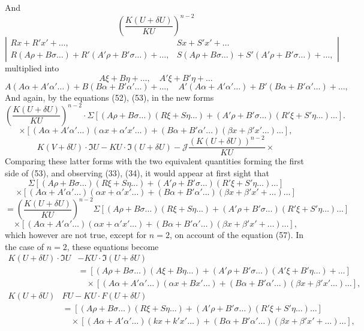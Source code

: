 \documentclass[11pt,a4paper]{book}
\begin{document}
And
\[
\left(\frac{K(U+\delta U)}{KU}\right)^{n-2}
\]
\[
\left|\begin{array}{cc}
Rx + R'x' + \ldots, & Sx + S'x' + \ldots \\
R(A\rho + B\sigma \ldots) + R'(A'\rho + B'\sigma \ldots) + \ldots, &
S(A\rho + B\sigma \ldots) + S'(A'\rho + B'\sigma \ldots) + \ldots,
\end{array}\right|
\]
multiplied into
\[
A\xi + B\eta + \ldots, \quad A'\xi + B'\eta + \ldots
\]
\[
A(A\alpha + A'\alpha' \ldots) + B(B\alpha + B'\alpha' \ldots) + \ldots, \quad
A'(A\alpha + A'\alpha' \ldots) + B'(B\alpha + B'\alpha' \ldots) + \ldots,
\]
And again, by the equations (52), (53), in the new forms
\[
\left(\frac{K(U+\delta U)}{KU}\right)^{n-2} \cdot
\Sigma[(A\rho + B\sigma \ldots)(R\xi + S\eta \ldots) + (A'\rho + B'\sigma \ldots)(R'\xi + S'\eta \ldots) \ldots]
\tag{65}.
\]
\[
\times [(A\alpha + A'\alpha' \ldots)(\alpha x + \alpha'x' \ldots) + (B\alpha + B'\alpha' \ldots)(\beta x + \beta'x' \ldots) \ldots]
\tag{66},
\]
\newpage
\[
K(V+\delta U) \cdot \mathfrak{I}U - KU \cdot \mathfrak{I}(U+\delta U)
-
\mathcal{J}\frac{(K(U+\delta U))^{n-2}}{KU} \times
\]
Comparing these latter forms with the two equivalent quantities forming the first side
of (53), and observing (33), (34), it would appear at first sight that
\[
\Sigma[(A\rho + B\sigma \ldots)(R\xi + S\eta \ldots) + (A'\rho + B'\sigma \ldots)(R'\xi + S'\eta \ldots) \ldots]
\]
\[
\times [(A\alpha + A'\alpha' \ldots)(\alpha x + \alpha'x' \ldots) + (B\alpha + B'\alpha' \ldots)(\beta x + \beta'x' + \ldots) \ldots]
\]
\[
= \left(\frac{K(U+\delta U)}{KU}\right)^{n-2} \Sigma[(A\rho + B\sigma \ldots)(R\xi + S\eta \ldots) + (A'\rho + B'\sigma \ldots)(R'\xi + S'\eta \ldots) \ldots]
\]
\[
\times [(A\alpha + A'\alpha' \ldots)(\alpha x + \alpha'x' \ldots) + (B\alpha + B'\alpha' \ldots)(\beta x + \beta'x' + \ldots) \ldots],
\]
which however are not true, except for $n = 2$, on account of the equation (57). In
the case of $n=2$, these equations become
\begin{align*}
K(U+\delta U) \cdot \mathfrak{I}U &- KU \cdot \mathfrak{I}(U+\delta U) \\
&= [(A\rho + B\sigma \ldots)(A\xi + B\eta \ldots) + (A'\rho + B'\sigma \ldots)(A'\xi + B'\eta \ldots) + \ldots] \\
&\quad \times [(A\alpha + A'\alpha' \ldots)(\alpha x + Bx' \ldots) + (B\alpha + B'\alpha' \ldots)(\beta x + \beta'x' \ldots) \ldots] \tag{68},
\end{align*}
\begin{align*}
K(U+\delta U) & FU - KU \cdot F(U+\delta U) \\
&= [(A\rho + B\sigma \ldots)(R\xi + S\eta \ldots) + (A'\rho + B'\sigma \ldots)(R'\xi + S'\eta \ldots) \ldots] \\
&\quad \times [(A\alpha + A'\alpha' \ldots)(kx + k'x' \ldots) + (B\alpha + B'\alpha' \ldots)(\beta x + \beta'x' + \ldots) \ldots] \tag{69},
\end{align*}
\end{document}
